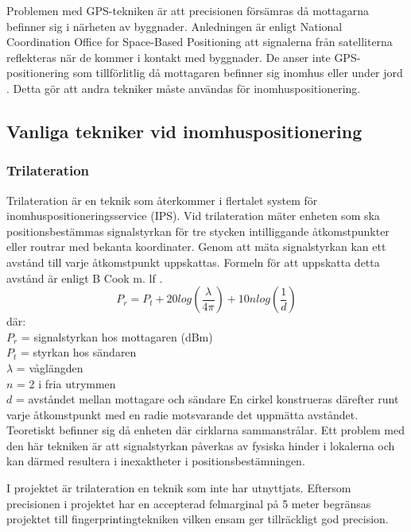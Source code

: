 \documentclass[swedish, a4paper,12pt]{article}
\begin{document}
Problemen med GPS-tekniken är att precisionen försämras då mottagarna befinner sig i närheten av byggnader. Anledningen är enligt National Coordination Office for Space-Based Positioning att signalerna från satelliterna reflekteras när de kommer i kontakt med byggnader. De anser inte GPS-positionering som tillförlitlig då mottagaren befinner sig inomhus eller under jord \cite{GPS_US_ACCURACY}. Detta gör att andra tekniker måste användas för inomhuspositionering.

\subsection{Vanliga tekniker vid inomhuspositionering}

\subsubsection{Trilateration}\label{triangulering}
Trilateration är en teknik som återkommer i flertalet system för inomhuspositioneringsservice (IPS). Vid trilateration mäter enheten som ska positionsbestämmas signalstyrkan för tre stycken intilliggande åtkomstpunkter eller routrar med bekanta koordinater. Genom att mäta signalstyrkan kan ett avstånd till varje åtkomstpunkt uppskattas. Formeln för att uppskatta detta avstånd är enligt B Cook m. lf \cite{cook2005indoor}.
\newline
$$ P_r = P_t + 20log(\frac{\lambda}{4\pi}) + 10nlog(\frac{1}{d})$$
där:\\
$  P_r $ = signalstyrkan hos mottagaren (dBm)\\
$P_t$ = styrkan hos sändaren\\
$\lambda$ = våglängden\\
$ n $ = 2 i fria utrymmen\\ %
$ d $ = avståndet mellan mottagare och sändare
\bigskip
\newline
En cirkel konstrueras därefter runt varje åtkomstpunkt med en radie motsvarande det uppmätta avståndet. %
Teoretiskt befinner sig då enheten där cirklarna sammanstrålar. Ett problem med den här tekniken är att signalstyrkan påverkas av fysiska hinder i lokalerna och kan därmed resultera i inexaktheter i positionsbestämningen.

I projektet är trilateration en teknik som inte har utnyttjats. Eftersom precisionen i projektet har en accepterad felmarginal på 5 meter begränsas projektet till fingerprintingtekniken vilken ensam ger tillräckligt god precision.
\end{document}
